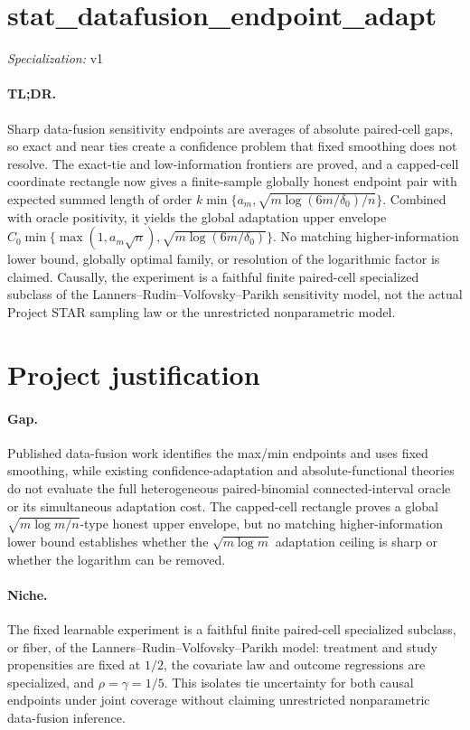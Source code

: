 \documentclass{article}
\begin{document}
\sloppy

\section*{stat\_\allowbreak{}datafusion\_\allowbreak{}endpoint\_\allowbreak{}adapt}

\noindent\textit{Specialization:} v1\par

\paragraph{TL;DR.} Sharp data-fusion sensitivity endpoints are averages of absolute paired-cell gaps, so exact and near ties create a confidence problem that fixed smoothing does not resolve. The exact-tie and low-information frontiers are proved, and a capped-cell coordinate rectangle now gives a finite-sample globally honest endpoint pair with expected summed length of order \(k\min\{a_m,\sqrt{m\log(6m/\delta_0)/n}\}\). Combined with oracle positivity, it yields the global adaptation upper envelope \(C_0\min\{\max(1,a_m\sqrt n),\sqrt{m\log(6m/\delta_0)}\}\). No matching higher-information lower bound, globally optimal family, or resolution of the logarithmic factor is claimed. Causally, the experiment is a faithful finite paired-cell specialized subclass of the Lanners--Rudin--Volfovsky--Parikh sensitivity model, not the actual Project STAR sampling law or the unrestricted nonparametric model.

\section{Project justification}

\paragraph{Gap.} Published data-fusion work identifies the max/min endpoints and uses fixed smoothing, while existing confidence-adaptation and absolute-functional theories do not evaluate the full heterogeneous paired-binomial connected-interval oracle or its simultaneous adaptation cost. The capped-cell rectangle proves a global \(\sqrt{m\log m/n}\)-type honest upper envelope, but no matching higher-information lower bound establishes whether the \(\sqrt{m\log m}\) adaptation ceiling is sharp or whether the logarithm can be removed.

\paragraph{Niche.} The fixed learnable experiment is a faithful finite paired-cell specialized subclass, or fiber, of the Lanners--Rudin--Volfovsky--Parikh model: treatment and study propensities are fixed at \(1/2\), the covariate law and outcome regressions are specialized, and \(\rho=\gamma=1/5\). This isolates tie uncertainty for both causal endpoints under joint coverage without claiming unrestricted nonparametric data-fusion inference.
\end{document}
